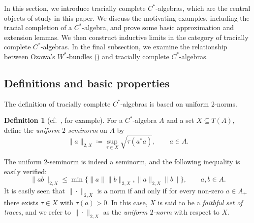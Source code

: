 \documentclass[a4paper,11pt]{amsart}
\theoremstyle{definition}
\newtheorem{definition}[theorem]{Definition}
\numberwithin{equation}{section}
\numberwithin{theorem}{section}
\begin{document}
In this section, we introduce tracially complete $C^*$-algebras, which are the central objects of study in this paper.
We discuss the motivating examples, including the tracial completion of a $C^*$-algebra, and prove some basic approximation and extension lemmas.
We then construct inductive limits in the category of tracially complete $C^*$-algebras. 
In the final subsection, we examine the relationship between Ozawa's $W^*$-bundles (\cite{Oz13}) and tracially complete $C^*$-algebras.

\subsection{Definitions and basic properties}\label{sec:tracially-complete-defs}
The definition of tracially complete $C^*$-algebras is based on uniform 2-norms.

\begin{definition}[{cf.\ \cite{KR14, Sa12, TWW15, Oz13}, for example}]\label{def:trace-norm}
For a $C^*$-algebra $A$ and a set $X \subseteq T(A)$, define the \emph{uniform $2$-seminorm} on $A$ by
\begin{equation}\label{eq:UniformTraceNorm}
	\|a\|_{2,X} \coloneqq \sup_{\tau \in X} \sqrt{\tau(a^*a)}, \qquad a \in A.
\end{equation}
\end{definition}


The uniform 2-seminorm is indeed a seminorm, and the following inequality is easily verified: 
\begin{equation}                           \label{eq:SpecialHolderIneq}
	\|ab\|_{2,X} \leq \min\{\|a\|\|b\|_{2,X}, \|a\|_{2,X}\|b\|\}, \qquad a,b \in A.
\end{equation}
It is easily seen that $\|\cdot\|_{2,X}$ is a norm if and only if for every non-zero $a \in A_+$ there exists $\tau \in X$ with $\tau(a) > 0$. In this case, $X$ is said to be a \emph{faithful set of traces}, and we refer to $\|\cdot\|_{2,X}$ as the \emph{uniform $2$-norm} with respect to $X$.
\end{document}
